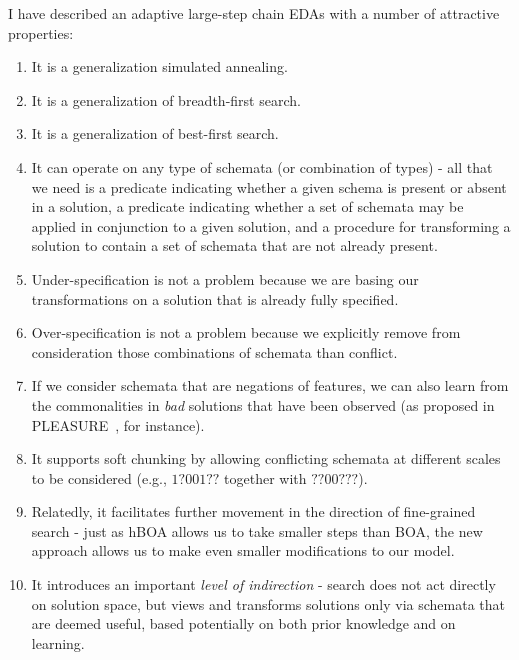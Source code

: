 \documentclass[letterpaper]{article}
\begin{document}
I have described an adaptive large-step chain EDAs with a number of attractive
properties:
\begin{enumerate}
\item It is a generalization simulated annealing.
\item It is a generalization of breadth-first search.
\item It is a generalization of best-first search.
\item It can operate on any type of schemata (or combination of types) - all
  that we need is a predicate indicating whether a given schema is present or
  absent in a solution, a predicate indicating whether a set of schemata may be
  applied in conjunction to a given solution, and a procedure for transforming
  a solution to contain a set of schemata that are not already present.
\item Under-specification is not a problem because we are basing our
  transformations on a solution that is already fully specified.
\item Over-specification is not a problem because we explicitly remove from
  consideration those combinations of schemata than conflict.
\item If we consider schemata that are negations of features, we can also learn
  from the commonalities in \emph{bad} solutions that have been observed (as
  proposed in PLEASURE~\cite{PLEASURE}, for instance).
\item It supports soft chunking by allowing conflicting schemata at different
  scales to be considered (e.g., $1?001??$ together with $??00???$). 
\item Relatedly, it facilitates further movement in the direction of
  fine-grained search - just as hBOA allows us to take smaller steps than BOA,
  the new approach allows us to make even smaller modifications to our model.
\item It introduces an important \emph{level of indirection} - search does not
  act directly on solution space, but views and transforms solutions only via
  schemata that are deemed useful, based potentially on both prior knowledge
  and on learning.
\end{enumerate}
\end{document}
